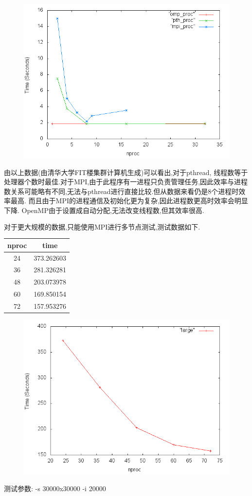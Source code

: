 \begin{enumerate}
\begin{figure}[H]
\centering
\includegraphics[scale=0.5]{res/chart.png}
\end{figure}

由以上数据(由清华大学FIT楼集群计算机生成)可以看出,对于pthread, 线程数等于处理器个数时最佳.对于MPI,由于此程序有一进程只负责管理任务,因此效率与进程数关系可能略有不同,无法与pthread进行直接比较.但从数据来看仍是8个进程时效率最高.
而且由于MPI的进程通信及初始化更为复杂,因此进程数更高时效率会明显下降.
OpenMP由于设置成自动分配,无法改变线程数,但其效率很高.

对于更大规模的数据,只能使用MPI进行多节点测试,测试数据如下.

\begin{table}[h]
	\centering
	\begin{tabular}{c|c}
		\hline
	nproc & time \\\hline
	24 & 373.262603 \\
	36 &281.326281 \\
	48 &203.073978\\
	60 &169.850154\\
	72 &157.953276 \\\hline
\end{tabular}
\end{table}

\begin{figure}[H]
	\centering
	\includegraphics[scale=0.6]{res/large.png}
\end{figure}
测试参数: -s 30000x30000 -i 20000

\end{enumerate}
